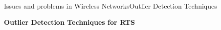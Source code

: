\begin{frame}{Issues and problems in Wireless Networks}{Outlier Detection Techniques}
\begin{block}{\textbf{Outlier Detection Techniques for RTS}}
\begin{minipage}[t]{0.38\linewidth}
	\end{minipage}
	
\end{block}
\end{frame}
